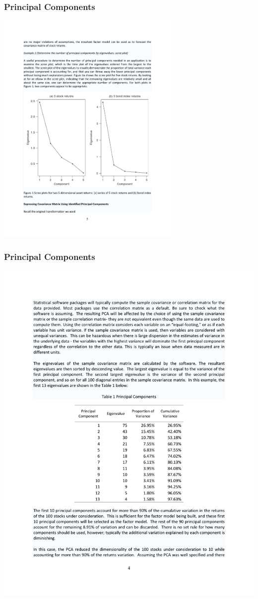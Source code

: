 \documentclass[xcolor=pdftex,dvipsnames,table,mathserif,aspectratio=169]{beamer}
\begin{document}
\begin{frame}
\frametitle{Principal Components}
\begin{center}
\includegraphics[width=3.5in]{./resources/princomp1}
\end{center}
\end{frame}

\begin{frame}
\frametitle{Principal Components}
\begin{center}
\includegraphics[height=0.9\textheight]{./resources/princomp2}
\end{center}
\end{frame}
\end{document}
